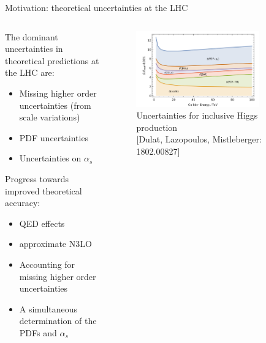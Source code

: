 \documentclass[aspectratio=169, 9pt,t]{beamer}
\begin{document}
\begin{frame}{Motivation: theoretical uncertainties at the LHC}

  \begin{columns}
    \begin{column}{0.55\textwidth}
      The dominant uncertainties in theoretical predictions at the LHC are:
      \begin{itemize}
        \item Missing higher order uncertainties (from scale variations)
        \item PDF uncertainties
        \item Uncertainties on $\alpha_s$
      \end{itemize}

      \vspace*{0.5em}
      Progress towards improved theoretical accuracy:
      \begin{itemize}
        \item QED effects
        \item approximate N3LO
        \item Accounting for missing higher order uncertainties
        \item A simultaneous determination of the PDFs and $\alpha_s$
      \end{itemize}
    \end{column}
    \begin{column}{0.44\textwidth}
      \begin{figure}
        \centering
        \includegraphics[width=0.8\textwidth]{figures/sources_of_unc_higgs.png}
        \caption*{ \small Uncertainties for inclusive Higgs production \\  {\color{gray}\small [Dulat, Lazopoulos, Mistleberger: 1802.00827]}}
      \end{figure}
    \end{column}
  \end{columns}
\end{frame}
\end{document}
